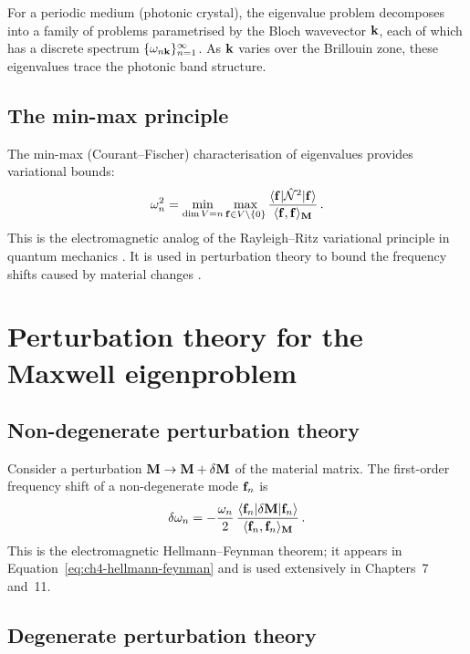 For a periodic medium (photonic crystal), the eigenvalue problem
decomposes into a family of problems parametrised by the Bloch
wavevector $\mathbf{k}$, each of which has a discrete spectrum
$\{\omega_{n\mathbf{k}}\}_{n=1}^\infty$.  As $\mathbf{k}$ varies over the
Brillouin zone, these eigenvalues trace the photonic band structure.

\subsection{The min-max principle}
\label{sec:appA-minmax}

The min-max (Courant--Fischer) characterisation of eigenvalues
provides variational bounds:
\begin{equation}\label{eq:appA-minmax}
  \omega_n^2 = \min_{\dim V=n}\max_{\mathbf{f}\in V\backslash\{0\}}
  \frac{\langle\mathbf{f}|\hat{\mathcal{N}}^2|\mathbf{f}\rangle}
  {\langle \mathbf{f} , \mathbf{f} \rangle_{\mathbf{M}}}\,.
\end{equation}
This is the electromagnetic analog of the Rayleigh--Ritz variational
principle in quantum mechanics \cite{nittis2020equivalence}.  It is used in perturbation theory
to bound the frequency shifts caused by material changes \cite{atala2013direct}.

\section{Perturbation theory for the Maxwell eigenproblem}
\label{sec:appA-perturbation}

\subsection{Non-degenerate perturbation theory}
\label{sec:appA-nondegenerate}

Consider a perturbation $\mathbf{M}\to\mathbf{M}+\delta\mathbf{M}$ of the material
matrix.  The first-order frequency shift of a non-degenerate mode
$\mathbf{f}_n$ is
\begin{equation}\label{eq:appA-first-order}
  \delta\omega_n
  = -\frac{\omega_n}{2}\,
  \frac{\langle\mathbf{f}_n|\delta\mathbf{M}|\mathbf{f}_n\rangle}
  {\langle \mathbf{f}_n , \mathbf{f}_n \rangle_{\mathbf{M}}}\,.
\end{equation}
This is the electromagnetic Hellmann--Feynman theorem; it appears in
Equation~\eqref{eq:ch4-hellmann-feynman} and is used extensively in Chapters~7
and~11.

\subsection{Degenerate perturbation theory}
\label{sec:appA-degenerate}

